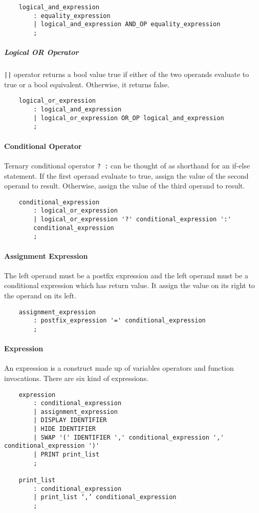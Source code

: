 \begin{verbatim}
    logical_and_expression
        : equality_expression
        | logical_and_expression AND_OP equality_expression
        ;
\end{verbatim}

\subparagraph{Logical OR Operator}
\verb"||" operator returns a bool value true if either of the two operands evaluate to true or a
bool equivalent. Otherwise, it returns false.

\begin{verbatim}
    logical_or_expression
        : logical_and_expression
        | logical_or_expression OR_OP logical_and_expression
        ;
\end{verbatim}

\paragraph{Conditional Operator}
Ternary conditional operator \verb"? :" can be thought of as shorthand for an if-else statement. If
the first operand evaluate to true, assign the value of the second operand to result. Otherwise,
assign the value of the third operand to result.

\begin{verbatim}
    conditional_expression
        : logical_or_expression
        | logical_or_expression '?' conditional_expression ':'
        conditional_expression
        ;
\end{verbatim}

\paragraph{Assignment Expression}
The left operand must be a postfix expression and the left operand must be a conditional expression
which has return value. It assign the value on its right to the operand on its left.

\begin{verbatim}
    assignment_expression
        : postfix_expression '=' conditional_expression
        ;
\end{verbatim}

\paragraph{Expression}
An expression is a construct made up of variables operators and function invocations. There are six
kind of expressions.

\begin{verbatim}
    expression
        : conditional_expression
        | assignment_expression
        | DISPLAY IDENTIFIER
        | HIDE IDENTIFIER
        | SWAP '(' IDENTIFIER ',' conditional_expression ',' conditional_expression ')'
        | PRINT print_list
        ;

    print_list
        : conditional_expression
        | print_list ‘,’ conditional_expression
        ; 
\end{verbatim}

